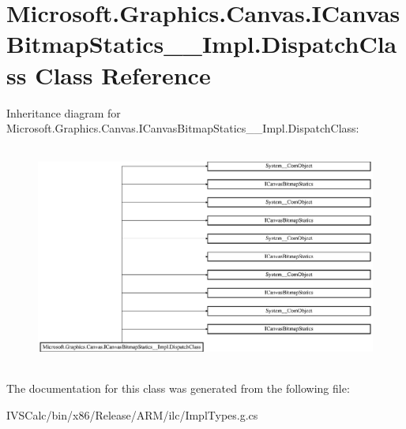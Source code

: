 \hypertarget{class_microsoft_1_1_graphics_1_1_canvas_1_1_i_canvas_bitmap_statics_____impl_1_1_dispatch_class}{}\section{Microsoft.\+Graphics.\+Canvas.\+I\+Canvas\+Bitmap\+Statics\+\_\+\+\_\+\+Impl.\+Dispatch\+Class Class Reference}
\label{class_microsoft_1_1_graphics_1_1_canvas_1_1_i_canvas_bitmap_statics_____impl_1_1_dispatch_class}
Inheritance diagram for Microsoft.\+Graphics.\+Canvas.\+I\+Canvas\+Bitmap\+Statics\+\_\+\+\_\+\+Impl.\+Dispatch\+Class\+:\begin{figure}[H]
\begin{center}
\leavevmode
\includegraphics[height=7.350835cm]{class_microsoft_1_1_graphics_1_1_canvas_1_1_i_canvas_bitmap_statics_____impl_1_1_dispatch_class}
\end{center}
\end{figure}


The documentation for this class was generated from the following file\+:\begin{DoxyCompactItemize}
\item 
I\+V\+S\+Calc/bin/x86/\+Release/\+A\+R\+M/ilc/Impl\+Types.\+g.\+cs\end{DoxyCompactItemize}
